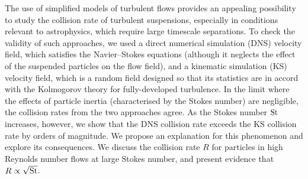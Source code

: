 The use of simplified models of turbulent flows provides an appealing possibility to study the collision rate of turbulent suspensions, especially in conditions relevant to astrophysics, which require large timescale separations.
To check the validity of such approaches, we used a direct numerical simulation (DNS) velocity field, which satisfies the Navier--Stokes equations (although it neglects the effect of the suspended particles on the flow field), and a kinematic simulation (KS) velocity field, which is a random field designed so that its statistics are in accord with the Kolmogorov theory for fully-developed turbulence.
In the limit where the effects of particle inertia (characterised by the Stokes number) are negligible, the collision rates from the two approaches agree.
As the Stokes number ${\rm St}$ increases, however, we show that the DNS collision rate exceeds the KS collision rate by orders of magnitude.
We propose an explanation for this phenomenon and explore its consequences.
We discuss the collision rate $R$ for particles in high Reynolds number flows at large Stokes number, and present evidence that $R\propto \sqrt{{\rm St}}$.
